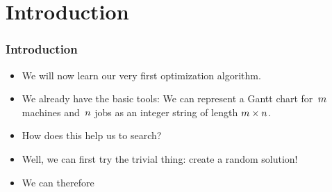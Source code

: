\documentclass[mathserif]{beamer}%
\subtitle{4. Random Sampling}%
\begin{document}
%
\startPresentation%
%
\section{Introduction}%
%
\begin{frame}%
\frametitle{Introduction}%
\begin{itemize}%
\item We will now learn our very first optimization algorithm.%
\item<2-> We already have the basic tools: We can represent a Gantt chart for~$m$ machines and~$n$ jobs as an integer string of length $m\times n$.%
\item<3-> How does this help us to search?%
\item<4-> Well, we can first try the trivial thing: create a random solution!%
\item<5-> We can therefore%
\end{itemize}%
\end{frame}%
%
\end{document}
